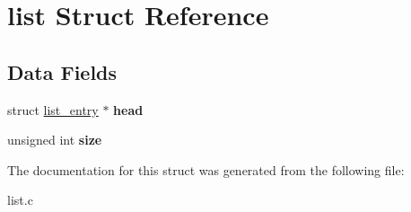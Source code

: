 \hypertarget{structlist}{}\section{list Struct Reference}
\label{structlist}
\subsection*{Data Fields}
\begin{DoxyCompactItemize}
\item 
\hypertarget{structlist_ad98153e8d06450eabdbaa623daf9d296}{}struct \hyperlink{structlist__entry}{list\+\_\+entry} $\ast$ {\bfseries head}\label{structlist_ad98153e8d06450eabdbaa623daf9d296}

\item 
\hypertarget{structlist_a766e43a13189610641f5432b6eefd5a6}{}unsigned int {\bfseries size}\label{structlist_a766e43a13189610641f5432b6eefd5a6}

\end{DoxyCompactItemize}


The documentation for this struct was generated from the following file\+:\begin{DoxyCompactItemize}
\item 
list.\+c\end{DoxyCompactItemize}
